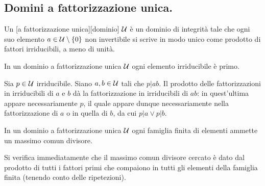 \subsection{Domini a fattorizzazione unica.}\label{DominiAFattorizzazioneUnica}
\begin{Definition}
	Un [a fattorizzazione unica][dominio] $\mathcal{U}$ \`e un dominio di integrit\`a tale che ogni suo elemento $a \in \mathcal{U} \setminus \lbrace 0 \rbrace$ non invertibile si scrive in modo unico come prodotto di fattori irriducibili, a meno di unit\`a.
\end{Definition}
\begin{Theorem}
	In un dominio a fattorizzazione unica $\mathcal{U}$ ogni elemento irriducibile \`e primo.
\end{Theorem}
\Proof Sia $p \in \mathcal{U}$ irriducibile. Siano $a,b \in \mathcal{U}$ tali che $p|ab$. Il prodotto delle fattorizzazioni in irriducibili di $a$ e $b$ d\`a la fattorizzazione in irriducibili di $ab$: in quest'ultima appare necessariamente $p$, il quale appare dunque necessariamente nella fattorizzazione di $a$ o in quella di $b$, da cui $p|a \vee p|b$. \EndProof
\begin{Theorem}
	In un dominio a fattorizzazione unica $\mathcal{U}$ ogni famiglia finita di elementi ammette un massimo comun divisore.
\end{Theorem}
\Proof Si verifica immediatamente che il massimo comun divisore cercato \`e dato dal prodotto di tutti i fattori primi che compaiono in tutti gli elementi della famiglia finita (tenendo conto delle ripetezioni). \EndProof
